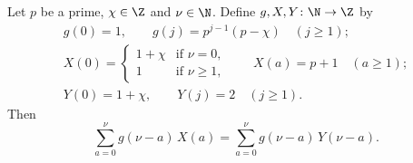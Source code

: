 Let $p$ be a prime, $\chi\in\Z$ and $\nu\in\N$. Define $g,X,Y\colon\N\to\Z$ by
\[
\begin{gathered}
  g(0)=1,\qquad g(j)=p^{j-1}(p-\chi)\quad(j\ge1);\\
  X(0)=\begin{cases}1+\chi&\text{if }\nu=0,\\1&\text{if }\nu\ge1,\end{cases}\qquad X(a)=p+1\quad(a\ge1);\\
  Y(0)=1+\chi,\qquad Y(j)=2\quad(j\ge1).
\end{gathered}
\]
Then
\[
  \sum_{a=0}^{\nu}g(\nu-a)\,X(a)=\sum_{a=0}^{\nu}g(\nu-a)\,Y(\nu-a).
\]
